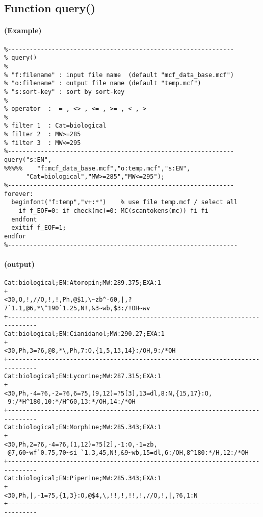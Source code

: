 \documentclass[a4paper]{article}
\begin{document}
\subsection{Function query()}
%
\paragraph{(Example)}
\begin{verbatim}
%--------------------------------------------------------------
% query()
%
% "f:filename" : input file name  (default "mcf_data_base.mcf")
% "o:filename" : output file name (default "temp.mcf")
% "s:sort-key" : sort by sort-key 
%
% operator  :  = , <> , <= , >= , < , >
%
% filter 1  : Cat=biological
% filter 2  : MW>=285
% filter 3  : MW<=295
%--------------------------------------------------------------
query("s:EN",
%%%%%    "f:mcf_data_base.mcf","o:temp.mcf","s:EN",
      "Cat=biological","MW>=285","MW<=295");
%--------------------------------------------------------------
forever:
  beginfont("f:temp","v+:*")    % use file temp.mcf / select all
    if f_EOF=0: if check(mc)=0: MC(scantokens(mc)) fi fi
  endfont
  exitif f_EOF=1;
endfor
%---------------------------------------------------------------
\end{verbatim}
\paragraph{(output)}
\begin{verbatim}
Cat:biological;EN:Atoropin;MW:289.375;EXA:1
+
<30,O,!,//O,!,!,Ph,@$1,\~zb^-60,|,?7`1.1,@6,*\^190`1.25,N!,&3~wb,$3:/!OH~wv 
+------------------------------------------------------------------------------
Cat:biological;EN:Cianidanol;MW:290.27;EXA:1
+
<30,Ph,3=?6,@8,*\,Ph,7:O,{1,5,13,14}:/OH,9:/*OH
+------------------------------------------------------------------------------
Cat:biological;EN:Lycorine;MW:287.315;EXA:1
+
<30,Ph,-4=?6,-2=?6,6=?5,(9,12)=?5[3],13=dl,8:N,{15,17}:O,
 9:/*H^180,10:*/H^60,13:*/OH,14:/*OH
+------------------------------------------------------------------------------
Cat:biological;EN:Morphine;MW:285.343;EXA:1
+
<30,Ph,2=?6,-4=?6,(1,12)=?5[2],-1:O,-1=zb,
 @7,60~wf`0.75,70~si_`1.3,45,N!,&9~wb,15=dl,6:/OH,8^180:*/H,12:/*OH
+------------------------------------------------------------------------------
Cat:biological;EN:Piperine;MW:285.343;EXA:1
+
<30,Ph,|,-1=?5,{1,3}:O,@$4,\,!!,!,!!,!,//O,!,|,?6,1:N
+------------------------------------------------------------------------------
\end{verbatim}
\noindent%
\newpage
\end{document}
